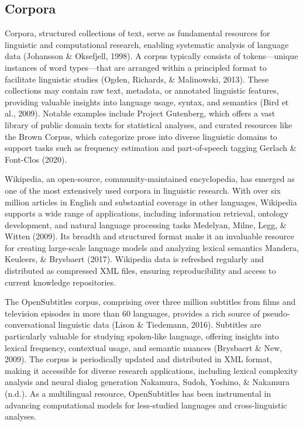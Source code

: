 \documentclass[
  english,
  man,floatsintext]{apa6}
\begin{document}
\subsection{Corpora}\label{corpora}

Corpora, structured collections of text, serve as fundamental resources for linguistic and computational research, enabling systematic analysis of language data (Johansson \& Oksefjell, 1998). A corpus typically consists of tokens---unique instances of word types---that are arranged within a principled format to facilitate linguistic studies (Ogden, Richards, \& Malinowski, 2013). These collections may contain raw text, metadata, or annotated linguistic features, providing valuable insights into language usage, syntax, and semantics (Bird et al., 2009). Notable examples include Project Gutenberg, which offers a vast library of public domain texts for statistical analyses, and curated resources like the Brown Corpus, which categorize prose into diverse linguistic domains to support tasks such as frequency estimation and part-of-speech tagging Gerlach \& Font-Clos (2020).

Wikipedia, an open-source, community-maintained encyclopedia, has emerged as one of the most extensively used corpora in linguistic research. With over six million articles in English and substantial coverage in other languages, Wikipedia supports a wide range of applications, including information retrieval, ontology development, and natural language processing tasks Medelyan, Milne, Legg, \& Witten (2009). Its breadth and structured format make it an invaluable resource for creating large-scale language models and analyzing lexical semantics Mandera, Keuleers, \& Brysbaert (2017). Wikipedia data is refreshed regularly and distributed as compressed XML files, ensuring reproducibility and access to current knowledge repositories.

The OpenSubtitles corpus, comprising over three million subtitles from films and television episodes in more than 60 languages, provides a rich source of pseudo-conversational linguistic data (Lison \& Tiedemann, 2016). Subtitles are particularly valuable for studying spoken-like language, offering insights into lexical frequency, contextual usage, and semantic nuances (Brysbaert \& New, 2009). The corpus is periodically updated and distributed in XML format, making it accessible for diverse research applications, including lexical complexity analysis and neural dialog generation Nakamura, Sudoh, Yoshino, \& Nakamura (n.d.). As a multilingual resource, OpenSubtitles has been instrumental in advancing computational models for less-studied languages and cross-linguistic analyses.
\end{document}
